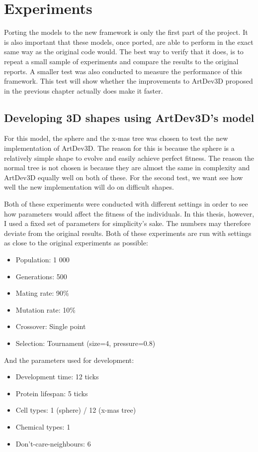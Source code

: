 \section{Experiments}
\label{sec:experiments}
Porting the models to the new framework is only the first part of the project. It is also important that these models, once ported, are able to perform in the exact same way as the original code would. The best way to verify that it does, is to repeat a small sample of experiments and compare the results to the original reports. A smaller test was also conducted to measure the performance of this framework. This test will show whether the improvements to ArtDev3D proposed in the previous chapter actually does make it faster.


\subsection{Developing 3D shapes using ArtDev3D's model}
For this model, the sphere and the x-mas tree was chosen to test the new implementation of ArtDev3D. The reason for this is because the sphere is a relatively simple shape to evolve and easily achieve perfect fitness. The reason the normal tree is not chosen is because they are almost the same in complexity and ArtDev3D equally well on both of these. For the second test, we want see how well the new implementation will do on difficult shapes.

Both of these experiments were conducted with different settings in order to see how parameters would affect the fitness of the individuals. In this thesis, however, I used a fixed set of parameters for simplicity's sake. The numbers may therefore deviate from the original results. Both of these experiments are run with settings as close to the original experiments as possible:

\begin{itemize}
	\itemsep=-2pt
	\item Population: 1 000
	\item Generations: 500
	\item Mating rate: 90\%
	\item Mutation rate: 10\%
	\item Crossover: Single point
	\item Selection: Tournament (size=4, pressure=0.8)
\end{itemize}

And the parameters used for development:

\begin{itemize}
	\itemsep=-2pt
	\item Development time: 12 ticks
	\item Protein lifespan: 5 ticks
	\item Cell types: 1 (sphere) / 12 (x-mas tree)
	\item Chemical types: 1
	\item Don't-care-neighbours: 6
\end{itemize}

